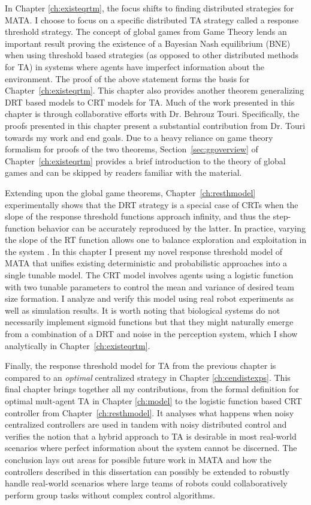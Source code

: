 \documentclass[12pt]{book}
\begin{document}
In Chapter \ref{ch:existeqrtm}, the focus shifts to finding distributed strategies for MATA. I choose to focus on a specific distributed TA strategy called a response threshold strategy. The concept of global games from Game Theory lends an important result proving the existence of a Bayesian Nash equilibrium (BNE) when using threshold based strategies (as opposed to other distributed methods for TA) in systems where agents have imperfect information about the environment. The proof of the above statement forms the basis for Chapter~\ref{ch:existeqrtm}. This chapter also provides another theorem generalizing DRT based models to CRT models for TA. Much of the work presented in this chapter is through collaborative efforts with Dr. Behrouz Touri. Specifically, the proofs presented in this chapter present a substantial contribution from Dr. Touri towards my work and end goals. Due to a heavy reliance on game theory formalism for proofs of the two theorems, Section~\ref{sec:ggoverview} of Chapter~\ref{ch:existeqrtm} provides a brief introduction to the theory of global games and can be skipped by readers familiar with the material.

Extending upon the global game theorems, Chapter~\ref{ch:resthmodel} experimentally shows that the DRT strategy is a special case of CRTs when the slope of the response threshold functions approach infinity, and thus the step-function behavior can be accurately reproduced by the latter. In practice, varying the slope of the RT function allows one to balance exploration and exploitation in the system \cite{Bonabeau1997}. In this chapter I present my novel response threshold model of MATA that unifies existing deterministic and probabilistic approaches into a single tunable model. The CRT model involves agents using a logistic function with two tunable parameters to control the mean and variance of desired team size formation. I analyze and verify this model using real robot experiments as well as simulation results. It is worth noting that biological systems do not necessarily implement sigmoid functions but that they might naturally emerge from a combination of a DRT and noise in the perception system, which I show analytically in Chapter~\ref{ch:existeqrtm}.

Finally, the response threshold model for TA from the previous chapter is compared to an \textit{optimal} centralized strategy in Chapter \ref{ch:cendistexps}. This final chapter brings together all my contributions, from the formal definition for optimal mult-agent TA in Chapter \ref{ch:model} to the logistic function based CRT controller from Chapter~\ref{ch:resthmodel}. It analyses what happens when noisy centralized controllers are used in tandem with noisy distributed control and verifies the notion that a hybrid approach to TA is desirable in most real-world scenarios where perfect information about the system cannot be discerned. The conclusion lays out areas for possible future work in MATA and how the controllers described in this dissertation can possibly be extended to robustly handle real-world scenarios where large teams of robots could collaboratively perform group tasks without complex control algorithms.
\end{document}
